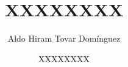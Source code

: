 \documentclass{article}
\title{XXXXXXXX}
\author{Aldo Hiram Tovar Domínguez}
\date{XXXXXXXX}
\begin{document}
\maketitle

\pagebreak
\end{document}
